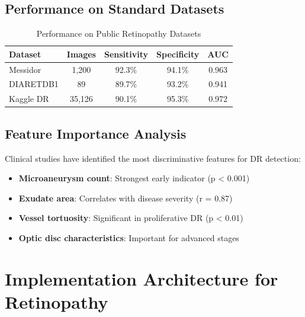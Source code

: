 \documentclass[12pt,a4paper]{article}
\begin{document}
\subsection{Performance on Standard Datasets}

\begin{table}[h!]
\centering
\caption{Performance on Public Retinopathy Datasets}
\label{tab:dr_performance}
\begin{tabular}{@{}lcccc@{}}
\toprule
\textbf{Dataset} & \textbf{Images} & \textbf{Sensitivity} & \textbf{Specificity} & \textbf{AUC} \\
\midrule
Messidor \cite{decenciere2014feedback} & 1,200 & 92.3\% & 94.1\% & 0.963 \\
DIARETDB1 \cite{kauppi2007diaretdb1} & 89 & 89.7\% & 93.2\% & 0.941 \\
Kaggle DR \cite{kaggle2015diabetic} & 35,126 & 90.1\% & 95.3\% & 0.972 \\
\bottomrule
\end{tabular}
\end{table}

\subsection{Feature Importance Analysis}

Clinical studies \cite{abbas2017review} have identified the most discriminative features for DR detection:

\begin{itemize}
    \item \textbf{Microaneurysm count}: Strongest early indicator (p < 0.001)
    \item \textbf{Exudate area}: Correlates with disease severity (r = 0.87)
    \item \textbf{Vessel tortuosity}: Significant in proliferative DR (p < 0.01)
    \item \textbf{Optic disc characteristics}: Important for advanced stages
\end{itemize}

\section{Implementation Architecture for Retinopathy}
\end{document}
